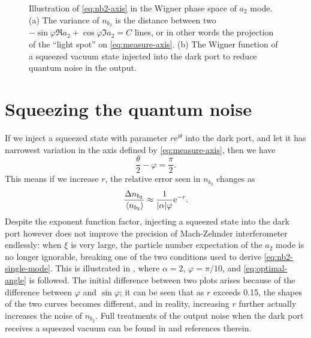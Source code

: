 \documentclass[hyperref, a4paper]{article}
\newcommand*{\ii}{\mathrm{i}}
\newcommand*{\ee}{\mathrm{e}}
\begin{document}
\begin{figure}
    \centering
    \begin{subfigure}{0.48\textwidth}
        \centering
        
        \subcaption{}
    \end{subfigure}
    \begin{subfigure}{0.48\textwidth}
        \centering
        
        \subcaption{}
    \end{subfigure}
    \caption{Illustration of \eqref{eq:nb2-axis} in the Wigner phase space of $a_2$ mode. 
    (a) The variance of $n_{b_2}$ is the distance 
    between two $-\sin \varphi \Re a_2 + \cos \varphi \Im a_2 = C$ lines,
    or in other words the projection of the ``light spot'' on \eqref{eq:measure-axis}.
    (b) The Wigner function of a squeezed vacuum state injected into the dark port 
    to reduce quantum noise in the output.
    }
    \label{fig:can-be-squeezed}
\end{figure}

\section{Squeezing the quantum noise}\label{sec:squeezing}

If we inject a squeezed state with parameter $r \ee^{\ii \theta}$ 
into the dark port,
and let it has narrowest variation in the axis defined by \eqref{eq:measure-axis}, 
then we have 
\begin{equation}
    \frac{\theta}{2} - \varphi = \frac{\pi}{2}.
    \label{eq:optimal-angle}
\end{equation}
This means if we increase $r$, 
the relative error seen in $n_{b_2}$ changes as 
\begin{equation}
    \frac{\Delta n_{b_2}}{\expval*{n_{b_2}}} \approx \frac{1}{\abs{\alpha} \varphi} \ee^{-r}.
    \label{eq:approx-squeezing}
\end{equation}
Despite the exponent function factor,
injecting a squeezed state into the dark port however does not improve 
the precision of Mach-Zehnder interferometer endlessly:
when $\xi$ is very large,
the particle number expectation of the $a_2$ mode is no longer ignorable,
breaking one of the two conditions used to derive \eqref{eq:nb2-single-mode}.
This is illustrated in ,
where $\alpha = 2$, $\varphi = \pi / 10$,
and \eqref{eq:optimal-angle} is followed.
The initial difference between two plots arises because of the difference between $\varphi$ and $\sin \varphi$;
it can be seen that as $r$ exceeds 0.15,
the shapes of the two curves becomes different,
and in reality, increasing $r$ further actually increases the noise of $n_{b_2}$.
Full treatments of the output noise when the dark port receives a squeezed vacuum
can be found in \cite{walls_quantum_2008,pezze_mach-zehnder_2008} and references therein.
\end{document}
